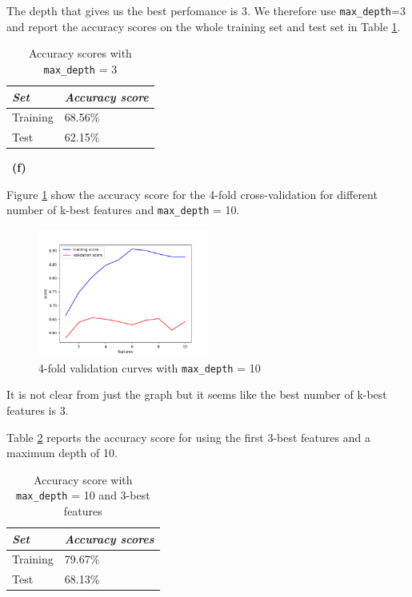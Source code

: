 \documentclass[a4 paper, 15pt]{article}
\numberwithin{equation}{section}
\newcommand{\subproblem}[1]{~\newline\textbf{(#1)}}
\begin{document}
The depth that gives us the best perfomance is 3. We therefore use \texttt{max\_depth}=3 and report the accuracy scores on the whole training set and test set in Table \ref{table:6}.

\begin{table}[h]
\centering
\begin{tabular}{l|l}
	\toprule
	\textit{Set} & \textit{Accuracy score} \\ \midrule
Training & 68.56\% \\
Test & 62.15\%
   \bottomrule
\end{tabular}
\caption{Accuracy scores with \texttt{max\_depth} = 3 \label{table:6}}
\end{table}



\subproblem{f}

Figure \ref{fig:3} show the accuracy score for the 4-fold cross-validation for different number of k-best features and \texttt{max\_depth} = 10.

\begin{figure}[H]
  \centering
\includegraphics[width=0.5\textwidth]{fig_3}
  \caption{4-fold validation curves with \texttt{max\_depth} = 10\label{fig:3}}
\end{figure}

It is not clear from just the graph but it seems like the best number of k-best features is 3.

Table \ref{table:7} reports the accuracy score for using the first 3-best features and a maximum depth of 10.

\begin{table}[h]
\centering
\begin{tabular}{l|l}
	\toprule
	\textit{Set} & \textit{Accuracy scores} \\ \midrule
Training & 79.67\% \\
Test & 68.13\%
   \bottomrule
\end{tabular}
\caption{Accuracy score with \texttt{max\_depth} = 10 and 3-best features\label{table:7}}
\end{table}
\end{document}
